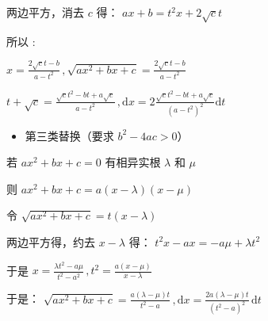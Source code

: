 两边平方，消去 $c$ 得： $ax+b=t^2x+2\sqrt{c}t$

所以 :

$\displaystyle{x=\frac{2\sqrt{c}t-b}{a-t^2}\,,\sqrt{ax^2+bx+c}=\frac{2\sqrt{c}t-b}{a-t^2}}$

$\displaystyle{t+\sqrt{c}=\frac{\sqrt{c}t^2-bt+a\sqrt{c}}{a-t^2}\,,\mathrm{d}x=2\frac{\sqrt{c}t^2-bt+a\sqrt{c}}{(a-t^2)^2}\mathrm{d}t}$ 

\begin{itemize}
\item 第三类替换（要求 $b^2-4ac>0$）
\end{itemize}
若 $ax^2+bx+c=0$ 有相异实根 $\lambda$ 和 $\mu$

则 $ax^2+bx+c=a(x-\lambda)(x-\mu)$

令 $\sqrt{ax^2+bx+c}=t(x-\lambda)$

两边平方得，约去 $x-\lambda$ 得： $t^2x-ax=-a\mu+\lambda t^2$

于是 $\displaystyle{x=\frac{\lambda t^2-a\mu}{t^2-a^2}\,,t^2=\frac{a(x-\mu)}{x-\lambda}}$ 

于是： $\displaystyle{\sqrt{ax^2+bx+c}=\frac{a(\lambda-\mu)t}{t^2-a}\,,\mathrm{d}x=\frac{2a(\lambda-\mu)t}{(t^2-a)^2}\,\mathrm{d}t}$ 